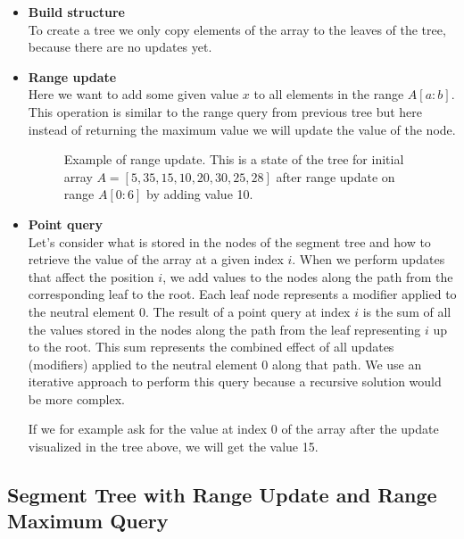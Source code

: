 \documentclass{article}
\begin{document}
\begin{itemize}
    \item \textbf{Build structure} \\
    To create a tree we only copy elements of the array to the leaves of the tree, 
    because there are no updates yet.
    \FloatBarrier
    \item \textbf{Range update} \\
    Here we want to add some given value $x$ to all elements in the range $A[a:b]$.
    This operation is similar to the range query from previous tree but here instead of
    returning the maximum value we will update the value of the node.
    
    \begin{figure}[H]
        \centering
        
        \caption{Example of range update. This is a state of the tree for initial array $A = [5, 35, 15, 10, 20, 30, 25, 28]$ after range update on range $A[0:6]$ by adding value 10.}
    \end{figure}

    \item \textbf{Point query} \\
    Let's consider what is stored in the nodes of the segment tree and how to retrieve the value of the array at a given index \( i \).
    When we perform updates that affect the position \( i \), we add values to the nodes along the path from the corresponding leaf to the root. Each leaf node represents a modifier applied to the neutral element \( 0 \).
    The result of a point query at index \( i \) is the sum of all the values stored in the nodes along the path from the leaf representing \( i \) up to the root. This sum represents the combined effect of all updates (modifiers) applied to the neutral element \( 0 \) along that path.
    We use an iterative approach to perform this query because a recursive solution would be more complex.
    

    If we for example ask for the value at index 0 of the array after the update visualized in
    the tree above, we will get the value 15. \\
\end{itemize}

\subsection{Segment Tree with Range Update and Range Maximum Query}
\end{document}
